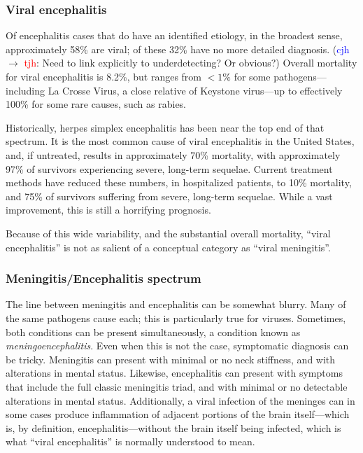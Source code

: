 \documentclass[12pt]{article}
\newcommand{\cjh}{\textcolor{blue}{cjh}}
\newcommand{\tjh}{\textcolor{red}{tjh}}
\newcommand{\msg}[3]{(#1 $\rightarrow$ #2: #3)}
\newcommand{\mcc}[1]{\msg\cjh\cjh{#1}}
\newcommand{\mct}[1]{\msg\cjh\tjh{#1}}
\begin{document}
        \subsubsection{Viral encephalitis}
            \label{viral-encephalitis}
            Of encephalitis cases that do have an identified etiology, in the broadest sense, approximately 58\% are viral; of these 32\% have no more detailed diagnosis. \mct{Need to link explicitly to underdetecting? Or obvious?} Overall mortality for viral encephalitis is 8.2\%, but ranges from $<1\%$ for some pathogens---including La Crosse Virus, a close relative of Keystone virus---up to effectively 100\% for some rare causes, such as rabies.

            Historically, herpes simplex encephalitis has been near the top end of that spectrum. It is the most common cause of viral encephalitis in the United States, and, if untreated, results in approximately 70\% mortality, with approximately 97\% of survivors experiencing severe, long-term sequelae. Current treatment methods have reduced these numbers, in hospitalized patients, to 10\% mortality, and 75\% of survivors suffering from severe, long-term sequelae. While a vast improvement, this is still a horrifying prognosis.
            
            Because of this wide variability, and the substantial overall mortality, ``viral encephalitis'' is not as salient of a conceptual category as ``viral meningitis''.

        \subsubsection{Meningitis/Encephalitis spectrum}
            \label{spectrum}
            The line between meningitis and encephalitis can be somewhat blurry. Many of the same pathogens cause each; this is particularly true for viruses. Sometimes, both conditions can be present simultaneously, a condition known as \textit{meningoencephalitis}. Even when this is not the case, symptomatic diagnosis can be tricky. Meningitis can present with minimal or no neck stiffness, and with alterations in mental status. Likewise, encephalitis can present with symptoms that include the full classic meningitis triad, and with minimal or no detectable alterations in mental status. Additionally, a viral infection of the meninges can in some cases produce inflammation of adjacent portions of the brain itself---which is, by definition, encephalitis---without the brain itself being infected, which is what ``viral encephalitis'' is normally understood to mean.
\end{document}
